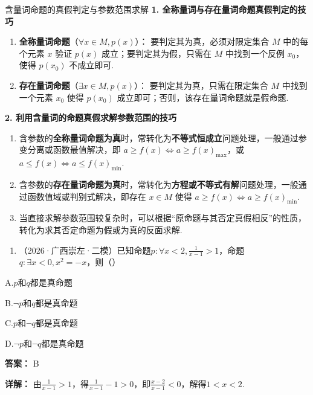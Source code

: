 \documentclass[11pt,a4paper]{ctexart}
\begin{document}
\begin{methodbox}{含量词命题的真假判定与参数范围求解}
  \textbf{1. 全称量词与存在量词命题真假判定的技巧}

\begin{enumerate}[label=(\arabic*), leftmargin=*]
    \item \textbf{全称量词命题}（$\forall x \in M, p(x)$）：
    要判定其为真，必须对限定集合 $M$ 中的每个元素 $x$ 验证 $p(x)$ 成立；要判定其为假，只需在 $M$ 中找到一个反例 $x_0$，使得 $p(x_0)$ 不成立即可.
    \item \textbf{存在量词命题}（$\exists x \in M, p(x)$）：
    要判定其为真，只需在限定集合 $M$ 中找到一个元素 $x_0$ 使得 $p(x_0)$ 成立即可；否则，该存在量词命题就是假命题.
  \end{enumerate}

  \vspace{0.5em}
  \textbf{2. 利用含量词的命题真假求解参数范围的技巧}
  

\begin{enumerate}[label=(\arabic*), leftmargin=*]
    \item 含参数的\textbf{全称量词命题为真}时，常转化为\textbf{不等式恒成立}问题处理，一般通过参变分离或函数最值解决，即 $a \ge f(x) \iff a \ge f(x)_{\max}$，或 $a \le f(x) \iff a \le f(x)_{\min}$.
    \item 含参数的\textbf{存在量词命题为真}时，常转化为\textbf{方程或不等式有解}问题处理，一般通过函数值域或判别式解决，即存在 $x \in M$ 使得 $a \ge f(x) \iff a \ge f(x)_{\min}$.
    \item 当直接求解参数范围较复杂时，可以根据“原命题与其否定真假相反”的性质，转化为求其否定命题为假或为真的反面求解.
  \end{enumerate}
\end{methodbox}

\begin{enumerate}[label=\arabic*., leftmargin=*]
\item （2026·广西崇左·二模）已知命题\(p: \forall x < 2, \frac{1}{x-1} > 1\)，命题\(q: \exists x < 0, x^2 = -x\)，则（）
\end{enumerate}

A.\(p\)和\(q\)都是真命题

B.\(\neg p\)和\(q\)都是真命题

C.\(p\)和\(\neg q\)都是真命题

D.\(\neg p\)和\(\neg q\)都是真命题

\textbf{答案：}
B

\textbf{详解：}
由\(\frac{1}{x - 1} > 1\)，得\(\frac{1}{x - 1} - 1 > 0\)，即\(\frac{x - 2}{x - 1} < 0\)，解得\(1 < x < 2\).
\end{document}
